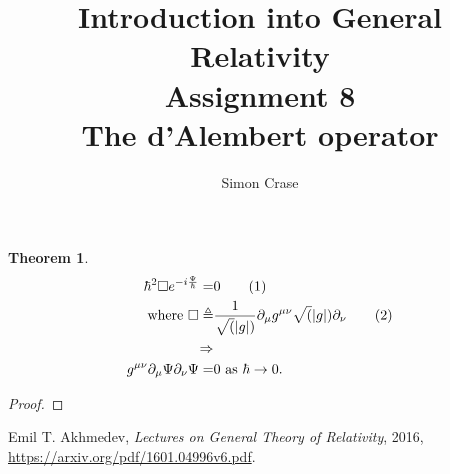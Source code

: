 \documentclass[]{article}
\title{Introduction into General Relativity\\Assignment 8\\The d'Alembert operator}
\author{Simon Crase}
\newtheorem{theorem}{Theorem}
\newcommand\numberthis{\addtocounter{equation}{1}\tag{\theequation}}
\begin{document}
\maketitle


\begin{theorem}
\begin{align*}
	\hbar^2 \Box e^{-i\frac{\Psi}{\hbar}}=&0 \numberthis \label{eq:hypothesis}\\ \text{ where } \Box \triangleq& \frac{1}{\sqrt(|g|)} \partial_{\mu} g^{\mu\nu}\sqrt(|g|)\partial_{\nu}\numberthis\label{eq:dlambert}\\ \Rightarrow&\\ g^{\mu\nu}\partial_{\mu}\Psi \partial_{\nu}\Psi=&0 \text{ as }\hbar \rightarrow 0.
\end{align*}
\end{theorem}

\begin{proof}
	

\end{proof}

\begin{thebibliography}{9}
	
	Emil T. Akhmedev,
	\emph{Lectures on General Theory of Relativity},
	2016,
	\url{https://arxiv.org/pdf/1601.04996v6.pdf}.
	

\end{thebibliography}
\end{document}
